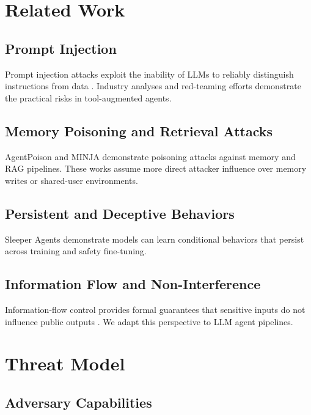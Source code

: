 \documentclass{article}
\begin{document}
\section{Related Work}

\subsection{Prompt Injection}

Prompt injection attacks exploit the inability of LLMs to reliably distinguish instructions from data \citep{prompt_injection_survey}. Industry analyses and red-teaming efforts demonstrate the practical risks in tool-augmented agents.

\subsection{Memory Poisoning and Retrieval Attacks}

AgentPoison \citep{agentpoison} and MINJA \citep{minja} demonstrate poisoning attacks against memory and RAG pipelines. These works assume more direct attacker influence over memory writes or shared-user environments.

\subsection{Persistent and Deceptive Behaviors}

Sleeper Agents \citep{sleeper_agents} demonstrate models can learn conditional behaviors that persist across training and safety fine-tuning.

\subsection{Information Flow and Non-Interference}

Information-flow control provides formal guarantees that sensitive inputs do not influence public outputs \citep{ifc_classic}. We adapt this perspective to LLM agent pipelines.

\section{Threat Model}

\subsection{Adversary Capabilities}
\end{document}

